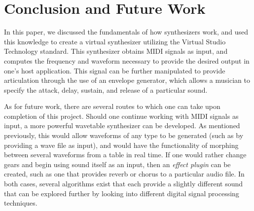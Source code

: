 \documentclass[12pt]{article}
\begin{document}
\newpage
\section{Conclusion and Future Work}
In this paper, we discussed the fundamentals of how synthesizers work, and used this knowledge to create a virtual synthesizer utilizing the Virtual Studio Technology standard. This synthesizer obtains MIDI signals as input, and computes the frequency and waveform necessary to provide the desired output in one's host application. This signal can be further manipulated to provide articulation through the use of an envelope generator, which allows a musician to specify the attack, delay, sustain, and release of a particular sound.

As for future work, there are several routes to which one can take upon completion of this project. Should one continue working with MIDI signals as input, a more powerful wavetable synthesizer can be developed. As mentioned previously, this would allow waveforms of any type to be generated (such as by providing a wave file as input), and would have the functionality of morphing between several waveforms from a table in real time. If one would rather change gears and begin using sound itself as an input, then an \textit{effect plugin} can be created, such as one that provides reverb or chorus to a particular audio file. In both cases, several algorithms exist that each provide a slightly different sound that can be explored further by looking into different digital signal processing techniques.

\newpage


\end{document}
